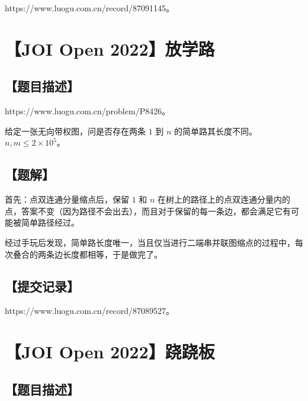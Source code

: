 \documentclass[UTF8,12pt,a4paper]{ctexart}
\begin{document}
	https://www.luogu.com.cn/record/87091145。
	
	
	\section*{【JOI Open 2022】放学路}
	
	\subsection*{【题目描述】}
	
	https://www.luogu.com.cn/problem/P8426。
	
	给定一张无向带权图，问是否存在两条 $1$ 到 $n$ 的简单路其长度不同。$n,m\le 2\times 10^5$。
	
	\subsection*{【题解】}
	
	首先：点双连通分量缩点后，保留 $1$ 和 $n$ 在树上的路径上的点双连通分量内的点，答案不变（因为路径不会出去），而且对于保留的每一条边，都会满足它有可能被简单路径经过。
	
	经过手玩后发现，简单路长度唯一，当且仅当进行二端串并联图缩点的过程中，每次叠合的两条边长度都相等，于是做完了。
	
	\subsection*{【提交记录】}
	
	https://www.luogu.com.cn/record/87089527。
	
	
	\section*{【JOI Open 2022】跷跷板}
	
	\subsection*{【题目描述】}
	
\end{document}
